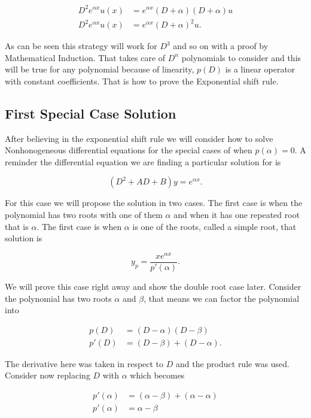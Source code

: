 \documentclass[12pt]{article}
\begin{document}
\begin{align*}
     D^2e^{\alpha x}u(x)&=e^{\alpha x}(D+ \alpha)(D+ \alpha)u \\
    D^2e^{\alpha x}u(x)&=e^{\alpha x}(D+ \alpha)^2 u.
\end{align*}

As can be seen this strategy will work for $D^3$ and so on with a proof by Mathematical Induction. That takes care of $D^n$ polynomials to consider and this will be true for any polynomial because of linearity, $p(D)$ is a linear operator with constant coefficients. That is how to prove the Exponential shift rule.

\subsection{First Special Case Solution}

After believing in the exponential shift rule we will consider how to solve Nonhonogeneous differential equations for the special cases of when $p(\alpha)=0$. A reminder the differential equation we are finding a particular solution for is

\begin{equation*}
    (D^2+AD+B)y = e^{\alpha x}.
\end{equation*}

For this case we will propose the solution in two cases. The first case is when the polynomial has two roots with one of them $\alpha$ and when it has one repeated root that is $\alpha$. The first case is when $\alpha$ is one of the roots, called a simple root, that solution is

\begin{equation*}
    y_p = \frac{xe^{\alpha x}}{p'(\alpha)}.
\end{equation*}

We will prove this case right away and show the double root case later. Consider the polynomial has two roots $\alpha$ and $\beta$, that means we can factor the polynomial into

\begin{align*}
    p(D)&=(D-\alpha)(D-\beta) \\
    p'(D)&=(D-\beta)+(D-\alpha).
\end{align*}

The derivative here was taken in respect to $D$ and the product rule was used. Consider now replacing $D$ with $\alpha$ which becomes

\begin{align*}
    p'(\alpha)&=(\alpha-\beta)+(\alpha-\alpha) \\
    p'(\alpha)&=\alpha-\beta 
\end{align*}
\end{document}
